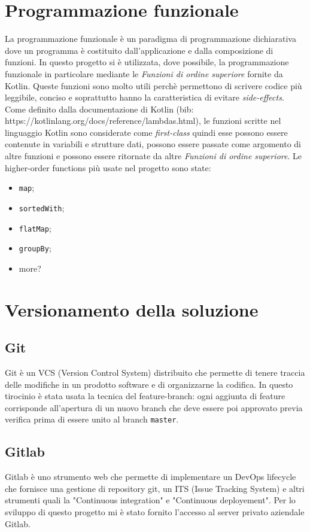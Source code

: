 \section{Programmazione funzionale}
La programmazione funzionale è un paradigma di programmazione dichiarativa dove un programma è costituito dall'applicazione e dalla composizione di funzioni. In questo progetto si è utilizzata, dove possibile, la programmazione funzionale in particolare mediante le \emph{Funzioni di ordine superiore} fornite da Kotlin. Queste funzioni sono molto utili perchè permettono di scrivere codice più leggibile, conciso e soprattutto hanno la caratteristica di evitare \emph{side-effects}. Come definito dalla documentazione di Kotlin (bib: https://kotlinlang.org/docs/reference/lambdas.html), le funzioni scritte nel linguaggio Kotlin sono considerate come \emph{first-class} quindi esse possono essere contenute in variabili e strutture dati, possono essere passate come argomento di altre funzioni e possono essere ritornate da altre \emph{Funzioni di ordine superiore}. Le higher-order functions più usate nel progetto sono state:
\begin{itemize}
	\item \verb|map|;
	\item \verb|sortedWith|;
	\item \verb|flatMap|;
	\item \verb|groupBy|;
	\item more?
\end{itemize}

\section{Versionamento della soluzione}
\subsection{Git}
Git è un VCS (Version Control System) distribuito che permette di tenere traccia delle modifiche in un prodotto software e di organizzarne la codifica. In questo tirocinio è stata usata la tecnica del feature-branch: ogni aggiunta di feature corrisponde all'apertura di un nuovo branch che deve essere poi approvato previa verifica prima di essere unito al branch \verb|master|.

\subsection{Gitlab}
Gitlab è uno strumento web che permette di implementare un DevOps lifecycle che fornisce una gestione di repository git, un ITS (Issue Tracking System) e altri strumenti quali la "Continuous integration" e "Continuous deployement". Per lo sviluppo di questo progetto mi è stato fornito l'accesso al server privato aziendale Gitlab.

